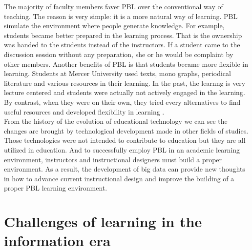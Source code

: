 \documentclass[sigconf]{acmart}
\begin{document}
The majority of faculty members faver PBL over the conventional way of teaching. The reason is very simple: it is a more natural way of learning. PBL simulate the environment where people generate knowledge. For example, students became better prepared in the learning process.  That is the ownership was handed to the students instead of the instructors. If a student came to the discussion session without any preparation, she or he would be complaint by other members. Another benefits of PBL is that students became more flexible in learning. Students at Mercer University used texts, mono graphs, periodical literature and various resources in their learning. In the past, the learnng is very lecture centered and students were actually not actively engaged in the learning. By contrast, when they were on their own, they tried every alternatives to find useful resources and developed flexibility in learning \cite{DIMansur2012}.\\



From the history of the evolution of educational technology we can see the changes are brought by technological development made in other fields of studies. Those technologies were not intended to contribute to education but they are all utilized in education. And to successfully employ PBL in an academic learning environment, instructors and instructional designers must build a proper environment. As a result, the development of big data can provide new thoughts in how to advance current instructional design and improve the building of a proper PBL learning environment.\\

\section{Challenges of learning in the information era}
\end{document}
